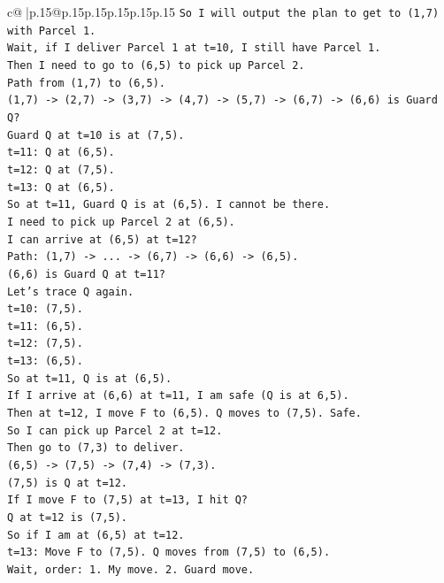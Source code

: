 \documentclass{article}
\begin{document}
{\begin{supertabular}{c@{$\;$}|p{.15\linewidth}@{}p{.15\linewidth}p{.15\linewidth}p{.15\linewidth}p{.15\linewidth}p{.15\linewidth}}
{{{\texttt{So I will output the plan to get to (1,7) with Parcel 1.} \\
\texttt{Wait, if I deliver Parcel 1 at t=10, I still have Parcel 1.} \\
\texttt{Then I need to go to (6,5) to pick up Parcel 2.} \\
\texttt{Path from (1,7) to (6,5).} \\
\texttt{(1,7) {-}> (2,7) {-}> (3,7) {-}> (4,7) {-}> (5,7) {-}> (6,7) {-}> (6,6) is Guard Q?} \\
\texttt{Guard Q at t=10 is at (7,5).} \\
\texttt{t=11: Q at (6,5).} \\
\texttt{t=12: Q at (7,5).} \\
\texttt{t=13: Q at (6,5).} \\
\texttt{So at t=11, Guard Q is at (6,5). I cannot be there.} \\
\texttt{I need to pick up Parcel 2 at (6,5).} \\
\texttt{I can arrive at (6,5) at t=12?} \\
\texttt{Path: (1,7) {-}> ... {-}> (6,7) {-}> (6,6) {-}> (6,5).} \\
\texttt{(6,6) is Guard Q at t=11?} \\
\texttt{Let's trace Q again.} \\
\texttt{t=10: (7,5).} \\
\texttt{t=11: (6,5).} \\
\texttt{t=12: (7,5).} \\
\texttt{t=13: (6,5).} \\
\texttt{So at t=11, Q is at (6,5).} \\
\texttt{If I arrive at (6,6) at t=11, I am safe (Q is at 6,5).} \\
\texttt{Then at t=12, I move F to (6,5). Q moves to (7,5). Safe.} \\
\texttt{So I can pick up Parcel 2 at t=12.} \\
\texttt{Then go to (7,3) to deliver.} \\
\texttt{(6,5) {-}> (7,5) {-}> (7,4) {-}> (7,3).} \\
\texttt{(7,5) is Q at t=12.} \\
\texttt{If I move F to (7,5) at t=13, I hit Q?} \\
\texttt{Q at t=12 is (7,5).} \\
\texttt{So if I am at (6,5) at t=12.} \\
\texttt{t=13: Move F to (7,5). Q moves from (7,5) to (6,5).} \\
\texttt{Wait, order: 1. My move. 2. Guard move.} \\
}}}
\end{supertabular}}
\end{document}
